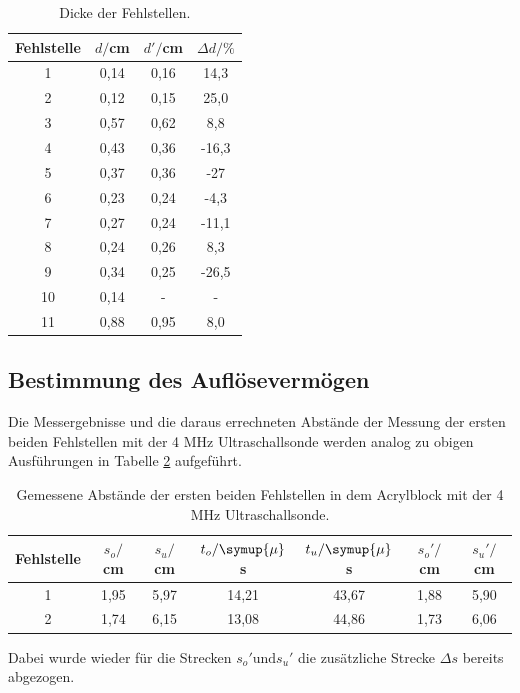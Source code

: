 \begin{table}[H]
  \centering
  \caption{Dicke der Fehlstellen.}
  \label{tab:spannung1}
  \begin{tabular}{c c c c}
    \toprule
  Fehlstelle & $d/$cm & $d'/$cm & $\Delta d/ \%$  \\
    \midrule
    1  &  0,14 & 0,16 & 14,3    \\
    2  &  0,12 & 0,15 & 25,0  \\
    3  &  0,57 & 0,62 & 8,8   \\
    4  &  0,43 & 0,36 & -16,3  \\
    5  &  0,37 & 0,36 & -27   \\
    6  &  0,23 & 0,24 & -4,3   \\
    7  &  0,27 & 0,24 & -11,1   \\
    8  &  0,24 & 0,26 & 8,3   \\
    9  &  0,34 & 0,25 & -26,5   \\
    10 &  0,14 & -    & -    \\
    11 &  0,88 & 0,95 & 8,0   \\
    \bottomrule
  \end{tabular}
\end{table}


\subsection{Bestimmung des Auflösevermögen}
Die Messergebnisse und die daraus errechneten Abstände der Messung der ersten beiden
Fehlstellen mit der 4 MHz Ultraschallsonde werden analog zu obigen Ausführungen in Tabelle \ref{tab:4} aufgeführt.

\begin{table}[H]
  \centering
  \caption{Gemessene Abstände der ersten beiden Fehlstellen in dem Acrylblock mit der 4 MHz Ultraschallsonde.}
  \label{tab:4}
  \begin{tabular}{c c c c c c c}
    \toprule
  Fehlstelle & $s_o/$cm & $s_u/$cm & $t_o/\symup{\mu}$s & $t_u/\symup{\mu}$s & $s_o'/$cm & $s_u'/$cm  \\
    \midrule
    1  &  1,95 & 5,97 & 14,21 & 43,67 & 1,88 & 5,90    \\
    2  &  1,74 & 6,15 & 13,08 & 44,86 & 1,73 & 6,06    \\
    \bottomrule
  \end{tabular}
\end{table}

Dabei wurde wieder für die Strecken $s_o' \text{und} s_u'$ die zusätzliche Strecke $\Delta s$ bereits abgezogen.

